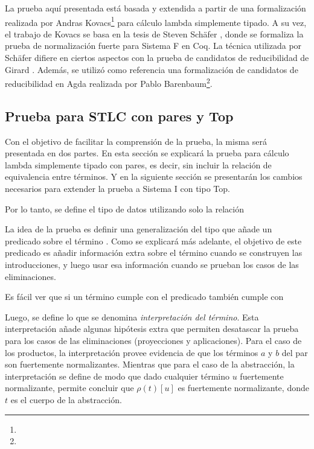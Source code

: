 La prueba aquí presentada está basada y extendida a partir de una formalización realizada por 
Andras Kovacs\footnote{} para cálculo lambda simplemente tipado.
A su vez, el trabajo de Kovacs se basa en la tesis de Steven Schäfer \cite{Schafer}, donde se formaliza la prueba de normalización fuerte para Sistema F en Coq.
La técnica utilizada por Schäfer difiere en ciertos aspectos con la prueba de candidatos de reducibilidad de Girard \cite{Girard}.
Además, se utilizó como referencia una formalización de candidatos de reducibilidad en Agda realizada por Pablo Barenbaum\footnote{}.

\subsection{Prueba para STLC con pares y Top}

Con el objetivo de facilitar la comprensión de la prueba, la misma será presentada en dos partes.
En esta sección se explicará la prueba para cálculo lambda simplemente tipado con pares, es decir, sin incluir la relación de equivalencia entre términos.
Y en la siguiente sección se presentarán los cambios necesarios para extender la prueba a Sistema I con tipo Top.

Por lo tanto, se define el tipo de datos  utilizando solo la relación \type{$\_\hookrightarrow\_$}


La idea de la prueba es definir una generalización del tipo  que añade un predicado sobre el término .
Como se explicará más adelante, el objetivo de este predicado es añadir información extra sobre el término cuando se construyen las introducciones, y luego usar esa información cuando se prueban los casos de las eliminaciones.


Es fácil ver que si un término cumple con el predicado  también cumple con 


Luego, se define lo que se denomina \textit{interpretación del término}.
Esta interpretación añade algunas hipótesis extra que permiten desatascar la prueba para los casos de las eliminaciones (proyecciones y aplicaciones).
Para el caso de los productos, la interpretación provee evidencia de que los términos $a$ y $b$ del par son fuertemente normalizantes.
Mientras que para el caso de la abstracción, la interpretación se define de modo que dado cualquier término $u$ fuertemente normalizante, permite concluir que $\rho (t) [u]$ es fuertemente normalizante, donde $t$ es el cuerpo de la abstracción.

